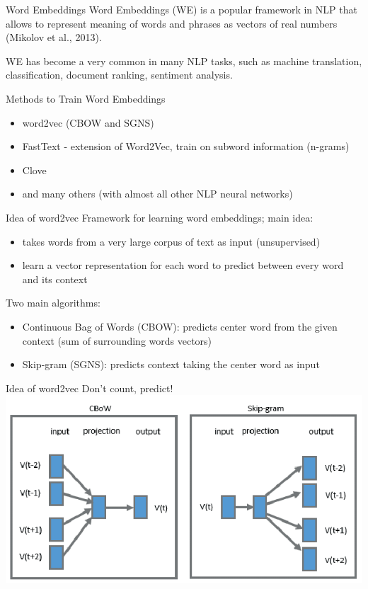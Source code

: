 \documentclass[svgnames]{beamer}
\begin{document}
    \begin{frame}{Word Embeddings}
        Word Embeddings (WE) is a popular framework in NLP that allows to represent meaning of words and phrases as vectors of real numbers (Mikolov et al., 2013).

        WE has become a very common in many NLP tasks, such as machine translation, classification, document ranking, sentiment analysis.
    \end{frame}

    \begin{frame}{Methods to Train Word Embeddings}
        \begin{itemize}
            \item word2vec (CBOW and SGNS)
            \item FastText - extension of Word2Vec, train on subword information (n-grams)
            \item Clove
            \item and many others (with almost all other NLP neural networks)
        \end{itemize}
    \end{frame}

    \begin{frame}{Idea of word2vec}
        Framework for learning word embeddings; main idea:
        \begin{itemize}
            \item takes words from a very large corpus of text as input
            (unsupervised)
            \item learn a vector representation for each word to predict between
            every word and its context
        \end{itemize}

        Two main algorithms:

        \begin{itemize}
            \item Continuous Bag of Words (CBOW): predicts center
            word from the given context (sum of surrounding words
            vectors)
            \item Skip-gram (SGNS): predicts context taking the center word as
            input
        \end{itemize}
    \end{frame}


    \begin{frame}{Idea of word2vec}
        Don’t count, predict!
        \includegraphics[width=\textwidth]{cbow_sgns}
    \end{frame}
\end{document}
